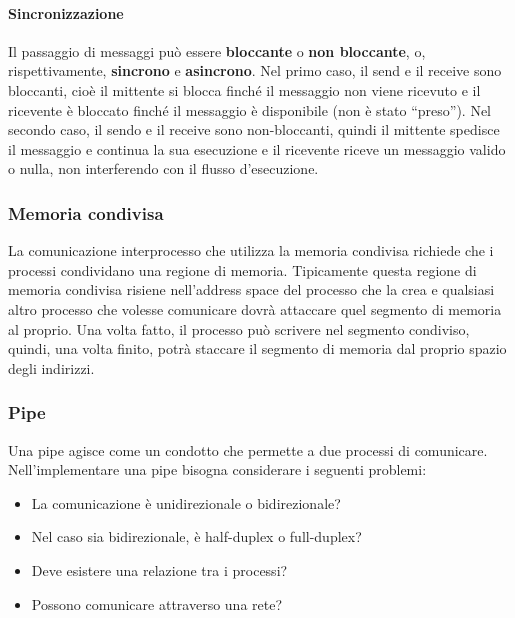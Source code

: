 \documentclass[a4paper]{article}
\begin{document}
\paragraph{Sincronizzazione}
Il passaggio di messaggi può essere \textbf{bloccante} o \textbf{non bloccante}, o, rispettivamente, \textbf{sincrono} e \textbf{asincrono}. Nel primo caso, il send e il receive sono bloccanti, cioè il mittente si blocca finché il messaggio non viene ricevuto e il ricevente è bloccato finché il messaggio è disponibile (non è stato ``preso''). Nel secondo caso, il sendo e il receive sono non-bloccanti, quindi il mittente spedisce il messaggio e continua la sua esecuzione e il ricevente riceve un messaggio valido o nulla, non interferendo con il flusso d'esecuzione.

\subsubsection{Memoria condivisa}
La comunicazione interprocesso che utilizza la memoria condivisa richiede che i processi condividano una regione di memoria. Tipicamente questa regione di memoria condivisa risiene nell'address space del processo che la crea e qualsiasi altro processo che volesse comunicare dovrà attaccare quel segmento di memoria al proprio. Una volta fatto, il processo può scrivere nel segmento condiviso, quindi, una volta finito, potrà staccare il segmento di memoria dal proprio spazio degli indirizzi.

\subsubsection{Pipe}
Una pipe agisce come un condotto che permette a due processi di comunicare. Nell'implementare una pipe bisogna considerare i seguenti problemi:
\begin{itemize}
    \item La comunicazione è unidirezionale o bidirezionale?
    \item Nel caso sia bidirezionale, è half-duplex o full-duplex?
    \item Deve esistere una relazione tra i processi?
    \item Possono comunicare attraverso una rete?
\end{itemize}
\end{document}
